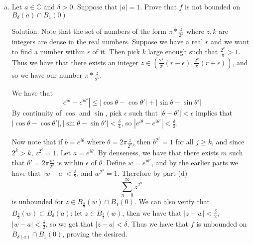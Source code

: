 \documentclass[11pt]{article}
\newcommand{\C}{\mathbb{C}}
\begin{document}
\begin{enumerate}[(1)]
\begin{enumerate}[(a)]
\item Let $a \in \C$ and $\delta > 0$. Suppose that $|a| = 1$. Prove that $f$ is not bounded on $B_{\delta}(a) \cap B_1(0)$

Solution: Note that the set of numbers of the form $\pi * \frac{z}{2^k}$ where $z, k$ are integers are dense in the real numbers. Suppose we have a real $r$ and we want to find a number within $\epsilon$ of it. Then pick $k$ large enough such that $\frac{2^k}{\pi} > 1$. Thus we have that there exists an integer $z \in (\frac{2^k}{\pi}(r -\epsilon), \frac{2^k }{\pi}(r + \epsilon))$, and so we have our number $\pi * \frac{z}{2^k}$. 

We have that 
$$ |e^{i\theta} - e^{i\theta'}| \leq |\cos \theta - \cos \theta'| + |\sin \theta - \sin \theta'| $$
By continuity of $\cos$ and $\sin$, pick $\epsilon$ such that $|\theta - \theta'| < \epsilon$ implies that $|\cos \theta - \cos \theta'|,|\sin \theta - \sin \theta'| < \frac{\delta}{4}$, so $|e^{i\theta} - e^{i\theta'}|  < \frac{\delta}{2}$.

Now note that if $b = e^{i\theta}$ where $\theta = 2\pi \frac{z}{2^k}$, then $b^{2^j} = 1$ for all $j \geq k$, and since $2^k > k$, $z^{2^k} = 1$. Let $a = e^{i\theta}$. By denseness, we have that there exists $m$ such that $\theta' = 2\pi \frac{m}{2^k}$ is within $\epsilon$ of $\theta$. Define $w = e^{i\theta'}$, and by the earlier parts we have that $|w - a| < \frac{\delta}{2}$, and $w^{2^k} = 1$. Therefore by part (d) 
$$\sum_{n=0}^{\infty} z^{2^n} $$
is unbounded for $z \in B_{\frac{\delta}{2}}(w) \cap B_1(0)$. We can also verify that $B_{\frac{\delta}{2}}(w) \subset B_{\delta}(a)$: let $z \in B_{\frac{\delta}{2}}(w)$, then we have that $|z - w| < \frac{\delta}{2}$, $|w - a| < \frac{\delta}{2}$, so we get that $|z - a| < \delta$. Thus we have that $f$ is unbounded on $B_{\delta(a)} \cap B_1(0)$, proving the desired.

\end{enumerate}


\end{enumerate}
\end{document}
